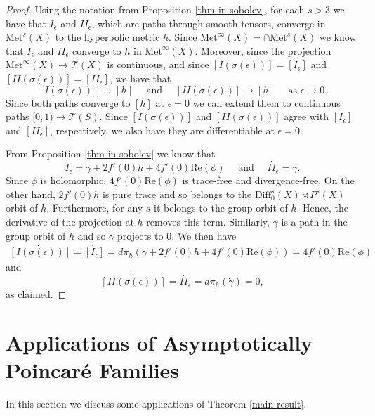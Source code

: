 \documentclass{amsart}
\newcommand{\two}{I\!\!I}
\begin{document}
\begin{proof}
Using the notation from  Proposition \ref{thm-in-sobolev}, for each $s > 3$ we have that $I_\epsilon$ and $\two_\epsilon$, which are paths through smooth tensors, converge in $\mathrm{Met}^s(X)$ to the hyperbolic metric $h$. 
Since $\mathrm{Met}^\infty(X)  = \cap \mathrm{Met}^s(X)$ we know that $I_\epsilon$ and $\two_\epsilon$ converge to $h$ in $\mathrm{Met}^\infty(X)$. 
Moreover, since the projection $\mathrm{Met}^\infty(X) \to \mathcal{T}(X)$ is continuous, and since $[I(\sigma(\epsilon))] = [I_\epsilon]$ and $[\two(\sigma(\epsilon))] = [\two_\epsilon]$, we have that
\[
[I(\sigma(\epsilon))] \to [h]
\quad \text{ and } \quad 
[\two(\sigma(\epsilon))] \to [h]
\quad \text{ as } \epsilon \to 0.
\]
Since both paths converge to $[h]$ at $\epsilon = 0$ we can extend them to continuous paths $[0,1) \to \mathcal{T}(S)$. 
Since $[I(\sigma(\epsilon))]$ and  $[\two(\sigma(\epsilon))]$ agree with $[I_\epsilon]$ and $[\two_\epsilon]$, respectively, we also have they are differentiable at $\epsilon = 0$.

From Proposition \ref{thm-in-sobolev} we know that 
\[
\dot{I_\epsilon}  = \dot{\gamma} + 2 f'(0) h + 4 f'(0) \mathrm{Re}(\phi) \quad \text{ and } \quad \dot{\two_\epsilon} = \dot{\gamma}.
\]
Since $\phi$ is holomorphic, $4 f'(0) \mathrm{Re}(\phi)$ is trace-free and divergence-free. 
On the other hand, $2 f'(0) h$ is pure trace and so belongs to the $\mathrm{Diff}_0^s(X) \rtimes P^s(X)$ orbit of $h$. Furthermore, for any $s$ it belongs to the group orbit of $h$. 
Hence, the derivative of the projection at $h$ removes this term.
Similarly, $\gamma$ is a path in the group orbit of $h$ and so $\dot{\gamma}$ projects to 0. 
We then have
\begin{align*}
\dot{[I(\sigma(\epsilon))]}
= \dot{[I_\epsilon]}
= d \pi_h (\dot{\gamma} + 2 f'(0) h + 4 f'(0) \mathrm{Re}(\phi)) 
= 4 f'(0) \mathrm{Re}(\phi)
\end{align*}
and
\[
\dot{[\two(\sigma(\epsilon))]} = \dot{\two_\epsilon} = d \pi_h (\dot{\gamma}) = 0,
\]
as claimed.
\end{proof}


\section{Applications of Asymptotically Poincar\'e Families} \label{applications}




In this section we discuss some applications of Theorem \ref{main-result}. 
\end{document}
